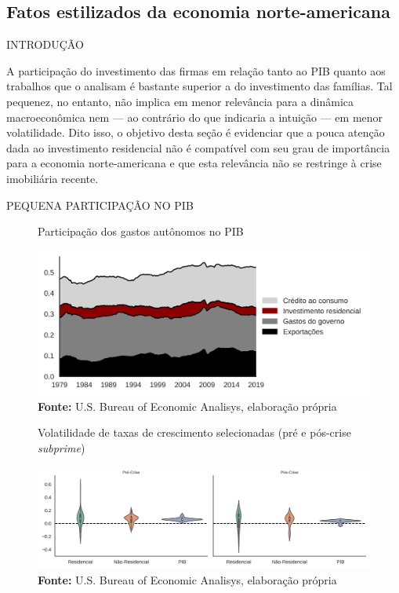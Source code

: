 \subsection{Fatos estilizados da economia norte-americana}\label{FatosEUA}



INTRODUÇÃO

A participação do investimento das firmas em relação tanto ao PIB quanto aos trabalhos que o analisam é bastante superior a do investimento das famílias. Tal pequenez, no entanto, não implica em menor relevância para a dinâmica macroeconômica nem --- ao contrário do que indicaria a intuição --- em menor volatilidade.
Dito isso, o objetivo desta seção é evidenciar que a pouca atenção dada ao investimento residencial não é compatível com seu grau de importância para a economia norte-americana e que esta relevância não se restringe à crise imobiliária recente.

PEQUENA PARTICIPAÇÃO NO PIB

\begin{figure}[htb]
	\centering
	\caption{Participação dos gastos autônomos no PIB}
	\label{FigVolatilidade}
	\includegraphics[width=\textwidth]{../../Dados/Fatos_Estilizados/figs/Gastos_autonomos.png}
	\caption*{\textbf{Fonte:} U.S. Bureau of Economic Analisys, elaboração própria}
\end{figure}


\begin{figure}[htb]
	\centering
	\caption{Volatilidade de taxas de crescimento selecionadas (pré e pós-crise \textit{subprime})}
	\label{FigVolatilidade}
	\includegraphics[width=\textwidth]{../../Dados/Fatos_Estilizados/figs/Volatilidade.png}
	\caption*{\textbf{Fonte:} U.S. Bureau of Economic Analisys, elaboração própria}
\end{figure}

